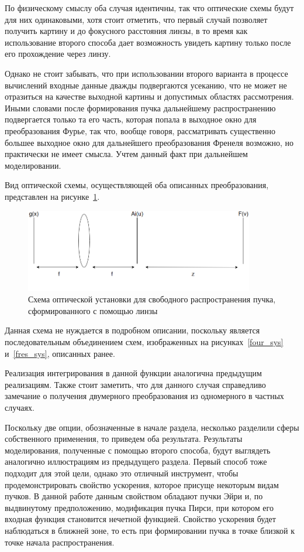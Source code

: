 {    По физическому смыслу оба случая идентичны, так что оптические схемы будут для них одинаковыми,
    хотя стоит отметить, что первый случай позволяет получить картину и до фокусного расстояния линзы,
    в то время как использование второго способа дает возможность увидеть картину только после его прохождение через линзу.

    Однако не стоит забывать, что при использовании второго варианта в процессе вычислений
    входные данные дважды подвергаются усеканию, что не может не отразиться на качестве
    выходной картины и допустимых областях рассмотрения. Иными словами после формирования пучка
    дальнейшему распространению подвергается только та его часть, которая попала в выходное окно для преобразования Фурье,
    так что, вообще говоря, рассматривать существенно большее выходное окно для дальнейшего преобразования Френеля возможно,
    но практически не имеет смысла. Учтем данный факт при дальнейшем моделировании.

    Вид оптической схемы, осуществляющей оба описанных преобразования, представлен на рисунке~\ref{four_fres_sys}.

    \begin{figure}[H]
        \begin{center}
            \includegraphics[width=10cm]{plots/four_fres_sys}
            \caption{Схема оптической установки для свободного распространения пучка, сформированного с помощью линзы}
            \label{four_fres_sys}
        \end{center}
    \end{figure}
    Данная схема не нуждается в подробном описании, поскольку является последовательным объединением схем,
    изображенных на рисунках~\ref{four_sys} и~\ref{fres_sys}, описанных ранее.

    Реализация интегрирования в данной функции аналогична предыдущим реализациям.
    Также стоит заметить, что для данного случая справедливо замечание
    о получения двумерного преобразования из одномерного в частных случаях.

    Поскольку две опции, обозначенные в начале раздела, несколько разделили сферы собственного применения,
    то приведем оба результата. Результаты моделирования, полученные с помощью второго способа,
    будут выглядеть аналогично иллюстрациям из предыдущего раздела. Первый способ тоже подходит для этой цели,
    однако это отличный инструмент, чтобы продемонстрировать свойство ускорения, которое присуще некоторым видам пучков.
    В данной работе данным свойством обладают пучки Эйри и, по выдвинутому предположению,
    модификация пучка Пирси, при котором его входная функция становится нечетной функцией.
    Свойство ускорения будет наблюдаться в ближней зоне, то есть при формировании пучка в точке близкой к точке начала распространения.

}

